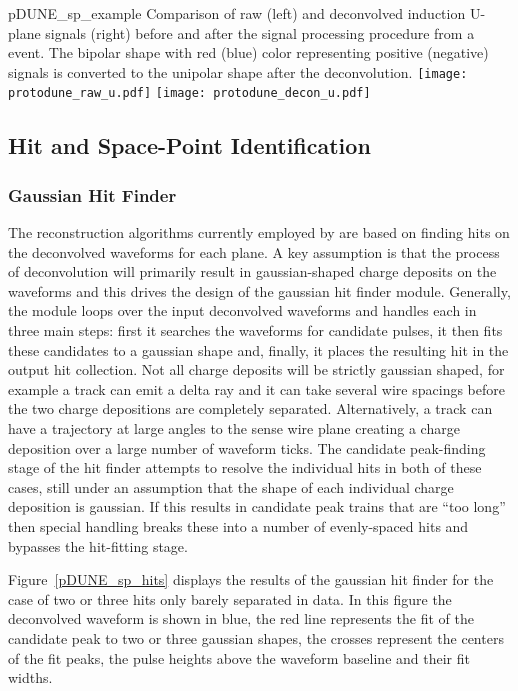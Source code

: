 \begin{dunefigure}
{pDUNE_sp_example}
{Comparison of raw (left) and deconvolved induction U-plane signals (right) before and after 
the signal processing procedure from a  event. The bipolar shape with red (blue) color representing
positive (negative) signals is converted to the unipolar shape after the \twod deconvolution.}
\texttt{[image: protodune\_raw\_u.pdf]}
\texttt{[image: protodune\_decon\_u.pdf]}\end{dunefigure}


\subsection{Hit and Space-Point Identification}

\subsubsection{Gaussian Hit Finder}\label{sec:gaushit}

The reconstruction algorithms currently employed by \larsoft are based on finding hits on the deconvolved waveforms for each plane. A key assumption is that the process of deconvolution will primarily result in gaussian-shaped charge deposits on the waveforms and this drives the design of the gaussian hit finder module. Generally, the module loops over the input deconvolved waveforms and handles each in three main steps: first it searches the waveforms %
for candidate pulses, it then fits these candidates %
to a gaussian shape and, finally, it places the resulting hit %
in the output hit collection. Not all charge deposits will be strictly gaussian shaped, for example a track can emit a delta ray and it can take several wire spacings before the two charge depositions are %
completely separated. Alternatively, a track can have a trajectory at large angles to the sense wire plane creating a charge deposition over a large number of waveform ticks. The candidate peak-finding stage of the hit finder attempts to resolve the individual hits in both of these cases, still under an assumption that the shape of each individual charge deposition is %
gaussian. If this results in candidate peak trains that are ``too long'' then special handling  breaks these into a number of evenly-spaced hits and bypasses the hit-fitting stage. 

Figure~\ref{pDUNE_sp_hits} displays the results of the gaussian hit finder for the case of two or three hits only barely separated in  data. In this figure the deconvolved waveform is shown in blue, the red line represents the fit of the candidate peak to two or three gaussian shapes, the crosses represent the centers of the fit peaks, the pulse heights above the waveform baseline and their fit widths. 

